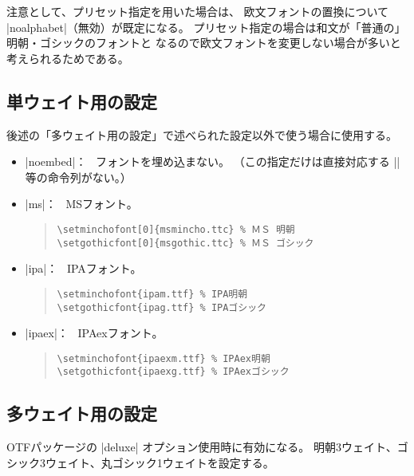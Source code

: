 \documentclass[a4paper,uplatex]{jsarticle}
\newcommand{\Pkg}[1]{\textsf{#1}}
\newcommand{\Means}{：\ }
\begin{document}
注意として、プリセット指定を用いた場合は、
欧文フォントの置換について |noalphabet|（無効）が既定になる。
プリセット指定の場合は和文が「普通の」明朝・ゴシックのフォントと
なるので欧文フォントを変更しない場合が多いと考えられるためである。

\subsection{単ウェイト用の設定}

後述の「多ウェイト用の設定」で述べられた設定以外で使う場合に使用する。

\begin{itemize}
\item |noembed|\Means
  フォントを埋め込まない。
  （この指定だけは直接対応する |\setminchofont| 等の命令列がない。）
\item |ms|\Means
  MSフォント。
\begin{quote}\small\begin{verbatim}
\setminchofont[0]{msmincho.ttc} % ＭＳ 明朝
\setgothicfont[0]{msgothic.ttc} % ＭＳ ゴシック
\end{verbatim}\end{quote}

\item |ipa|\Means
  IPAフォント。
\begin{quote}\small\begin{verbatim}
\setminchofont{ipam.ttf} % IPA明朝
\setgothicfont{ipag.ttf} % IPAゴシック
\end{verbatim}\end{quote}

\item |ipaex|\Means
  IPAexフォント。
\begin{quote}\small\begin{verbatim}
\setminchofont{ipaexm.ttf} % IPAex明朝
\setgothicfont{ipaexg.ttf} % IPAexゴシック
\end{verbatim}\end{quote}
\end{itemize}

\subsection{多ウェイト用の設定}

\Pkg{OTF}パッケージの |deluxe| オプション使用時に有効になる。
明朝3ウェイト、ゴシック3ウェイト、丸ゴシック1ウェイトを設定する。
\end{document}
